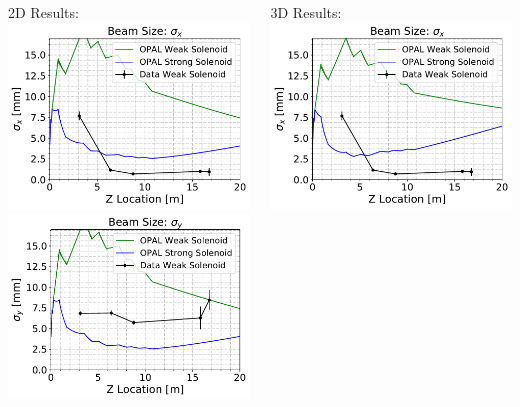 \documentclass[professionalfonts,t]{beamer}
\begin{document}
\begin{frame}
\begin{columns}[T] %
	\begin{column}{.5\textwidth}
		2D Results:
    \includegraphics[width=0.75\linewidth]{../images/beamsizes_2Dx} \\ \vspace{0.25em}
    \includegraphics[width=0.75\linewidth]{../images/beamsizes_2Dy}
	\end{column}%
	\hfill%
	\begin{column}{.5\textwidth}
		3D Results:
		\includegraphics[width=0.75\linewidth]{../images/beamsizes_3Dx} \\ \vspace{0.25em}

\end{column}
\end{columns}
\end{frame}
\end{document}
